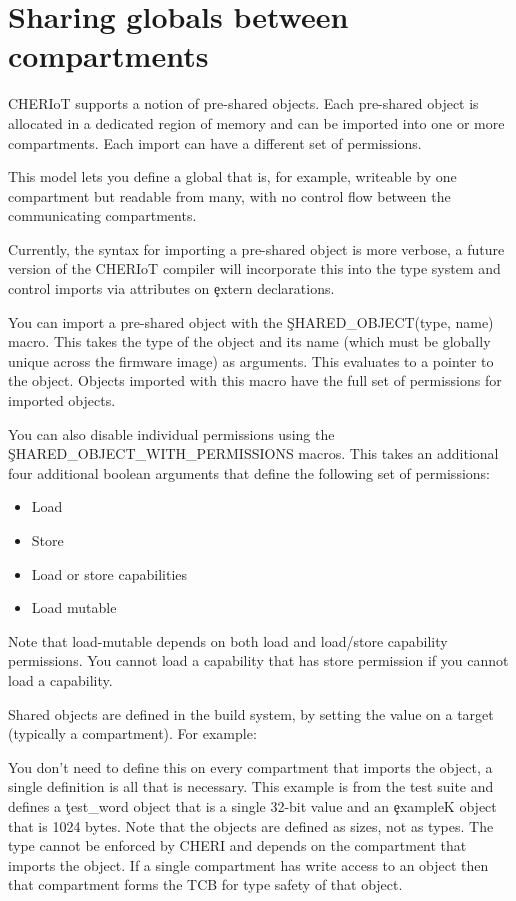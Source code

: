 \section{Sharing globals between compartments}

CHERIoT supports a notion of pre-shared objects.
Each pre-shared object is allocated in a dedicated region of memory and can be imported into one or more compartments.
Each import can have a different set of permissions.

This model lets you define a global that is, for example, writeable by one compartment but readable from many, with no control flow between the communicating compartments.

Currently, the syntax for importing a pre-shared object is more verbose, a future version of the CHERIoT compiler will incorporate this into the type system and control imports via attributes on \c{extern} declarations.

You can import a pre-shared object with the \c{SHARED_OBJECT(type, name)} macro.
This takes the type of the object and its name (which must be globally unique across the firmware image) as arguments.
This evaluates to a pointer to the object.
Objects imported with this macro have the full set of permissions for imported objects.

You can also disable individual permissions using the \c{SHARED_OBJECT_WITH_PERMISSIONS} macros.
This takes an additional four additional boolean arguments that define the following set of permissions:

\begin{itemize}
	\item{Load}
	\item{Store}
	\item{Load or store capabilities}
	\item{Load mutable}
\end{itemize}

Note that load-mutable depends on both load and load/store capability permissions.
You cannot load a capability that has store permission if you cannot load a capability.

Shared objects are defined in the build system, by setting the  value on a target (typically a compartment).
For example:

\begin{luasnippet}
    on_load(function(target)
        target:values_set("shared_objects", { exampleK = 1024, test_word = 4 \}, {expand = false\})
    end)
\end{luasnippet}

You don't need to define this on every compartment that imports the object, a single definition is all that is necessary.
This example is from the test suite and defines a \c{test_word} object that is a single 32-bit value and an \c{exampleK} object that is 1024 bytes.
Note that the objects are defined as sizes, not as types.
The type cannot be enforced by CHERI and depends on the compartment that imports the object.
If a single compartment has write access to an object then that compartment forms the TCB for type safety of that object.
